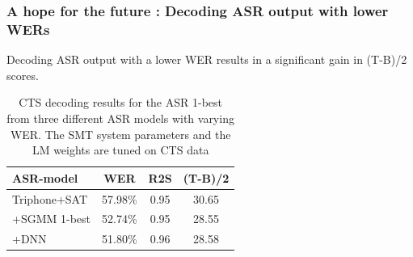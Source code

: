 \documentclass{beamer}
\begin{document}
\begin{frame}
\frametitle{A hope for the future : Decoding ASR output with lower WERs}
Decoding ASR output with a lower WER results in a significant gain in (T-B)/2 scores.

\begin{table}
\begin{center}
\begin{tabular}{| l | c | c || c |}
  \hline 
  \textbf{ASR-model} & \textbf{WER} & \textbf{R2S} & \textbf{(T-B)/2}\\ \hline
  Triphone+SAT & 57.98\% & 0.95 & 30.65\\
  \hline
  +SGMM 1-best & 52.74\% & 0.95 & 28.55\\
  \hline
  +DNN & 51.80\% & 0.96 & 28.58\\
  \hline
\end{tabular}
\caption{CTS decoding results for the ASR 1-best from three different ASR models with varying WER. The SMT system parameters and the LM weights are tuned on CTS data}
\end{center}
\end{table} 
\end{frame}

\end{document}
